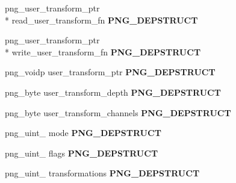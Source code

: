 \begin{DoxyCompactItemize}
\item 
\hypertarget{structpng__struct__def_ad0b52f9be2ef43aadc117eb95031f795}{png\-\_\-user\-\_\-transform\-\_\-ptr \\*
read\-\_\-user\-\_\-transform\-\_\-fn {\bfseries P\-N\-G\-\_\-\-D\-E\-P\-S\-T\-R\-U\-C\-T}}\label{structpng__struct__def_ad0b52f9be2ef43aadc117eb95031f795}

\item 
\hypertarget{structpng__struct__def_a1bd0208cd2a13c2a2e4e757e0796bd69}{png\-\_\-user\-\_\-transform\-\_\-ptr \\*
write\-\_\-user\-\_\-transform\-\_\-fn {\bfseries P\-N\-G\-\_\-\-D\-E\-P\-S\-T\-R\-U\-C\-T}}\label{structpng__struct__def_a1bd0208cd2a13c2a2e4e757e0796bd69}

\item 
\hypertarget{structpng__struct__def_a5b13f553c9500461d7e005087cf5c8e0}{png\-\_\-voidp user\-\_\-transform\-\_\-ptr {\bfseries P\-N\-G\-\_\-\-D\-E\-P\-S\-T\-R\-U\-C\-T}}\label{structpng__struct__def_a5b13f553c9500461d7e005087cf5c8e0}

\item 
\hypertarget{structpng__struct__def_a8aa43b565f81be7201b0d0713b021b4b}{png\-\_\-byte user\-\_\-transform\-\_\-depth {\bfseries P\-N\-G\-\_\-\-D\-E\-P\-S\-T\-R\-U\-C\-T}}\label{structpng__struct__def_a8aa43b565f81be7201b0d0713b021b4b}

\item 
\hypertarget{structpng__struct__def_a587de62e86963bd3850197ea93ae9b9e}{png\-\_\-byte user\-\_\-transform\-\_\-channels {\bfseries P\-N\-G\-\_\-\-D\-E\-P\-S\-T\-R\-U\-C\-T}}\label{structpng__struct__def_a587de62e86963bd3850197ea93ae9b9e}

\item 
\hypertarget{structpng__struct__def_a5afb69cc7bc6529a6b597cde55bb344b}{png\-\_\-uint\-\_ mode {\bfseries P\-N\-G\-\_\-\-D\-E\-P\-S\-T\-R\-U\-C\-T}}\label{structpng__struct__def_a5afb69cc7bc6529a6b597cde55bb344b}

\item 
\hypertarget{structpng__struct__def_a3d6f05cd70d6fd1a5979cc853ac4d3a9}{png\-\_\-uint\-\_ flags {\bfseries P\-N\-G\-\_\-\-D\-E\-P\-S\-T\-R\-U\-C\-T}}\label{structpng__struct__def_a3d6f05cd70d6fd1a5979cc853ac4d3a9}

\item 
\hypertarget{structpng__struct__def_a687761b8330757466fd58552ab48e428}{png\-\_\-uint\-\_ transformations {\bfseries P\-N\-G\-\_\-\-D\-E\-P\-S\-T\-R\-U\-C\-T}}\label{structpng__struct__def_a687761b8330757466fd58552ab48e428}


\end{DoxyCompactItemize}
